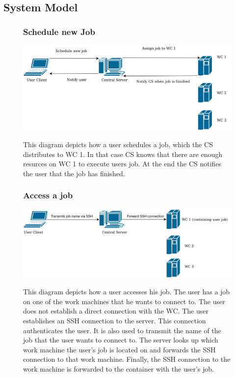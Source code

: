 \subsection{System Model}
\begin{figure}
  \subsubsection{Schedule new Job}
  \centering
  \includegraphics[width=\linewidth]{./system/systemmodel/images/schedulejob.png}
  \label{new-job}
  \caption{This diagram depicts how a user schedules a job, which the CS distributes to WC 1.
  In that case CS knows that there are enough resurces on WC 1 to execute users job.
  At the end the CS notifies the user that the job has finished.}
\end{figure}

\begin{figure}
  \subsubsection{Access a job}
  \centering
  \includegraphics[width=\linewidth]{./system/systemmodel/images/accessjob.png}
  \label{access-job}
  \caption{This diagram depicts how a user accesses his job.
  The user has a job on one of the work machines that he wants to connect to.
  The user does not establish a direct connection with the WC.
  The user establishes an SSH connection to the server.
  This connection authenticates the user.
  It is also used to transmit the name of the job that the user wants to connect to.
  The server looks up which work machine the user's job is located on and forwards the SSH connection to that work machine.
  Finally, the SSH connection to the work machine is forwarded to the container with the user's job.}
\end{figure}

